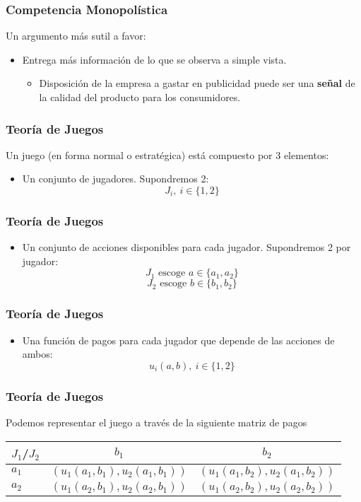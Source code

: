 \documentclass[dvipsnames,table,leqno]{beamer}
\newcommand{\peq}[1]{{\scriptscriptstyle{#1}}}
\newcommand{\rp}[1]{\left(#1\right)}
\begin{document}
		\begin{frame}
			\frametitle{Competencia Monopolística}
			Un argumento más sutil a favor:
			\begin{itemize}
				\item Entrega más información de lo que se observa a simple vista.
					\begin{itemize}
						\item Disposición de la empresa a gastar en publicidad puede ser una \textbf{señal} de la calidad del producto para los consumidores.
					\end{itemize}
			\end{itemize}
		\end{frame}	
		
		\begin{frame}
			\frametitle{Teoría de Juegos}
			Un juego (en forma normal o estratégica) está compuesto por 3 elementos:
			\begin{itemize}
				\item Un conjunto de jugadores. Supondremos 2: $$J_\peq{i}, \ i\in\{1,2\}$$
			\end{itemize}
		\end{frame}		

		\begin{frame}
			\frametitle{Teoría de Juegos}
			\begin{itemize}
				\item Un conjunto de acciones disponibles para cada jugador. Supondremos 2 por jugador: $$J_\peq{1}\text{ escoge } a\in\{a_\peq{1},a_\peq{2}\}$$ $$J_\peq{2}\text{ escoge } b\in\{b_\peq{1},b_\peq{2}\}$$
			\end{itemize}
		\end{frame}		

		\begin{frame}
			\frametitle{Teoría de Juegos}
			\begin{itemize}
				\item Una función de pagos para cada jugador que depende de las acciones de ambos: $$u_\peq{i}\rp{a,b}, \ i\in\{1,2\}$$
			\end{itemize}
		\end{frame}	

		\begin{frame}
			\frametitle{Teoría de Juegos}
			Podemos representar el juego a través de la siguiente matriz de pagos
			\begin{table}[htbp!]
				\centering
					\begin{tabular}{|l|c|c|}\hline
						$J_\peq{1}$/$J_\peq{2}$&$b_\peq{1}$&$b_\peq{2}$ \\ [1ex] \hline
						$a_\peq{1}$						 &$\rp{u_\peq{1}\rp{a_\peq{1},b_\peq{1}},u_\peq{2}\rp{a_\peq{1},b_\peq{1}}}$&$\rp{u_\peq{1}\rp{a_\peq{1},b_\peq{2}},u_\peq{2}\rp{a_\peq{1},b_\peq{2}}}$ \\ [1ex] \hline 
						$a_\peq{2}$						 &$\rp{u_\peq{1}\rp{a_\peq{2},b_\peq{1}},u_\peq{2}\rp{a_\peq{2},b_\peq{1}}}$&$\rp{u_\peq{1}\rp{a_\peq{2},b_\peq{2}},u_\peq{2}\rp{a_\peq{2},b_\peq{2}}}$ \\ [1ex] \hline 
					\end{tabular}%
			\end{table}
		\end{frame}	
\end{document}
